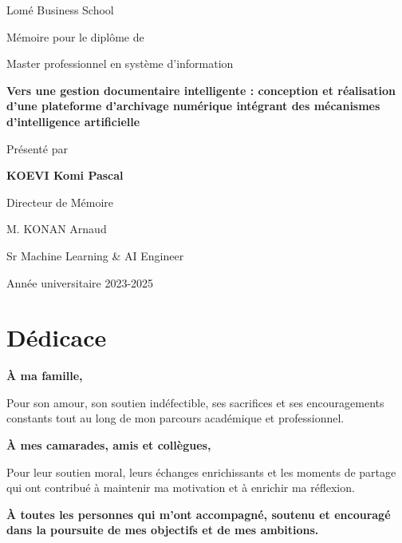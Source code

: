 \documentclass[12pt,a4paper]{report}
\title{\rapportTitre}
\author{\parbox{0.95\textwidth}{\centering
  \auteurNom\\
  \diplome\\
  \directeurNom\\
  \structureAccueil\\
  \tuteurStage
}}
\date{Avril 2026}
\newcommand{\rapportTitre}{Vers une gestion documentaire intelligente : conception et réalisation d'une plateforme d'archivage numérique intégrant des mécanismes d'intelligence artificielle}
\newcommand{\auteurNom}{KOEVI Komi Pascal}
\newcommand{\typeDocument}{Mémoire pour le diplôme de}
\newcommand{\diplome}{Master professionnel en système d'information}
\newcommand{\nomEcole}{Lomé Business School}
\newcommand{\directeurNom}{M. KONAN Arnaud}
\newcommand{\directeurFonction}{Sr Machine Learning \& AI Engineer}
\begin{document}
\begin{titlepage}
  \thispagestyle{empty}
  \centering
  \vspace*{1cm}
  {\Large \nomEcole\par}
  \vspace{1.5cm}

  {\large \typeDocument\par}
  \vspace{0.2cm}
  {\large \diplome}\par
  \vspace{2cm}

  {\LARGE \textbf{\rapportTitre}\par}
  \vspace{2.2cm}

  {\large Présenté par\par}
  \vspace{0.2cm}
  {\large \textbf{\auteurNom}\par}
  \vspace{1.5cm}

  {\large Directeur de Mémoire\par}
  \vspace{0.3cm}
  {\directeurNom\par}
  {\directeurFonction\par}
  \vspace{0.8cm}

  \vfill
  {Année universitaire 2023-2025\par}
\end{titlepage}

\setcounter{page}{1}

\chapter*{Dédicace}

\textbf{À ma famille,}

Pour son amour, son soutien indéfectible, ses sacrifices et ses encouragements constants tout au long de mon parcours académique et professionnel.

\textbf{À mes camarades, amis et collègues,}

Pour leur soutien moral, leurs échanges enrichissants et les moments de partage qui ont contribué à maintenir ma motivation et à enrichir ma réflexion.

\textbf{À toutes les personnes qui m’ont accompagné, soutenu et encouragé dans la poursuite de mes objectifs et de mes ambitions.}
\end{document}
